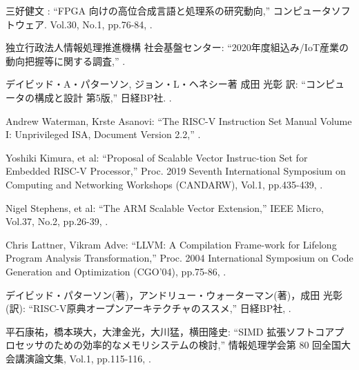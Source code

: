 {\small 三好健文 : %
\newblock ``FPGA 向けの高位合成言語と処理系の研究動向,''
\newblock コンピュータソフトウェア. 
\newblock Vol.30,
\newblock No.1,
\newblock pp.76-84,
.}


{\small 独立行政法人情報処理推進機構 社会基盤センター: %
\newblock ``2020年度組込み/IoT産業の動向把握等に関する調査,''
.}

{\small デイビッド・A・パターソン, ジョン・L・ヘネシー著 成田 光彰 訳: %
\newblock ``コンピュータの構成と設計 第5版,''
\newblock 日経BP社. 
.}

{\small Andrew Waterman, Krste Asanovi: %
\newblock ``The RISC-V Instruction Set Manual Volume I: Unprivileged ISA, Document Version 2.2,''
.}

{\small Yoshiki Kimura, et al:      %
\newblock ``Proposal of Scalable Vector Instruc-tion Set for Embedded RISC-V Processor,''
\newblock Proc. 2019 Seventh International Symposium on Computing and Networking Workshops (CANDARW),
\newblock Vol.1,
\newblock pp.435-439,
.}

{\small Nigel Stephens, et al:      %
\newblock ``The ARM Scalable Vector Extension,''
\newblock IEEE Micro,
\newblock Vol.37,
\newblock No.2,
\newblock pp.26-39,
.}

{\small Chris Lattner, Vikram Adve:      %
\newblock ``LLVM: A Compilation Frame-work for Lifelong Program Analysis Transformation,''
\newblock Proc. 2004 International Symposium on Code Generation and Optimization (CGO’04),
\newblock pp.75-86,
.}

{\small デイビッド・パターソン(著)，アンドリュー・ウォーターマン(著)，成田 光彰(訳):      %
\newblock ``RISC-V原典オープンアーキテクチャのススメ,''
\newblock 日経BP社,
.}

{\small 平石康祐，橋本瑛大，大津金光，大川猛，横田隆史:      %
\newblock ``SIMD 拡張ソフトコアプロセッサのための効率的なメモリシステムの検討,''
\newblock 情報処理学会第 80 回全国大会講演論文集,
\newblock Vol.1,
\newblock pp.115-116,
.}
